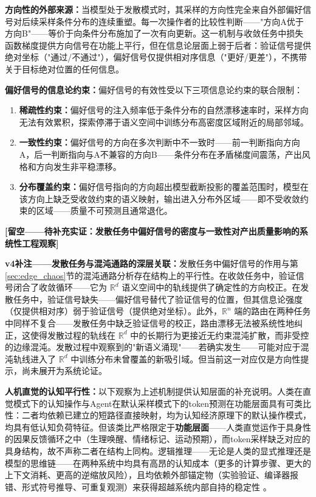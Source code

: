 \documentclass[11pt,a4paper]{article}
\theoremstyle{definition}
\begin{document}
\textbf{方向性的外部来源：}当模型处于发散模式时，其采样的方向性完全来自外部偏好信号对后续采样条件分布的连续重塑。每一次操作者的比较性判断——"方向A优于方向B"——等价于向条件分布施加了一次有向更新。这一机制与收敛任务中损失函数梯度提供方向信号在功能上平行，但在信息论层面上弱于后者：验证信号提供绝对坐标（"通过/不通过"），偏好信号仅提供相对序信息（"更好/更差"），不携带关于目标绝对位置的任何信息。

\textbf{偏好信号的信息论约束：}偏好信号的有效性受以下三项信息论约束的联合限制：
\begin{enumerate}[leftmargin=*,itemsep=0.3em]
    \item \textbf{稀疏性约束：}偏好信号的注入频率低于条件分布的自然漂移速率时，采样方向无法有效累积，探索停滞于语义空间中训练分布高密度区域附近的局部邻域。
    \item \textbf{一致性约束：}偏好信号的方向在多次判断中不一致时——前一判断指向方向A，后一判断指向与A不兼容的方向B——条件分布在矛盾梯度间震荡，产出风格和方向发生非平稳漂移。
    \item \textbf{分布覆盖约束：}偏好信号指向的方向超出模型截断投影的覆盖范围时，模型在该方向上缺乏受收敛约束的语义映射，输出进入分布外区域——即不受收敛约束的区域——质量不可预测且通常退化。
\end{enumerate}

\textbf{[留空——待补充实证：发散任务中偏好信号的密度与一致性对产出质量影响的系统性工程观察]}

\textbf{v4补注——发散任务与混沌通路的深层关联：}发散任务中偏好信号的作用与第\ref{sec:edge_chaos}节的混沌通路分析存在结构上的平行性。在收敛任务中，验证信号闭合了收敛循环——它为 $\mathbb{R}^d$ 语义空间中的轨线提供了确定性的方向校正。在发散任务中，验证信号缺失——偏好信号替代了验证信号的位置，但其信息论强度（仅提供相对序）弱于验证信号（提供绝对坐标）。此外，$\mathbb{R}^n$ 端的路由在两种任务中同样不复合——发散任务中缺乏验证信号的校正，路由漂移无法被系统性地纠正，这使得发散过程的轨线在 $\mathbb{R}^d$ 中的长期行为更接近无约束混沌扩散，而非受控的边缘混沌。发散过程中观察到的"新语义涌现"——若确实发生——可能对应于混沌轨线进入了 $\mathbb{R}^d$ 中训练分布未曾覆盖的新吸引域。但当前这一对应仅是方向性提示，尚未展开为系统论证。

\textbf{人机直觉的认知平行性：}以下观察为上述机制提供认知层面的补充说明。人类在直觉模式下的认知操作与Agent在默认采样模式下的token预测在功能层面具有可类比性：二者均依赖已建立的短路径直接映射，均为认知经济原理下的默认操作模式，均具有低认知负荷特征。但该类比严格限定于\textbf{功能层面}——人类直觉运作于具身性的因果反馈循环之中（生理唤醒、情绪标记、运动预期），而token采样缺乏对应的具身结构，故不声称二者在结构上同构。逻辑推理——无论是人类的显式推理还是模型的思维链——在两种系统中均具有高昂的认知成本（更多的计算步骤、更大的上下文消耗、更高的逆缩放风险），且均依赖外部锚定物（实验验证、编译器报错、形式符号推导、可重复观测）来获得超越系统内部自持的稳定性 \cite{kahneman2011}。
\end{document}
